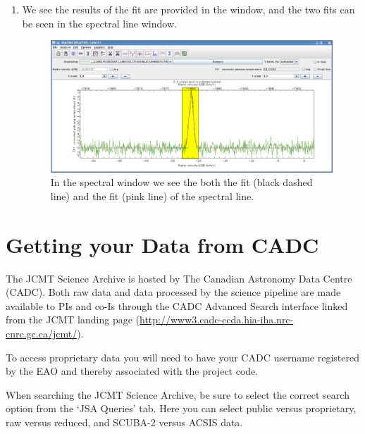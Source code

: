 \documentclass[11pt,oneside,chapters]{starlink}
\begin{document}
\begin{enumerate}[label=(\textbf{\arabic*})]
\item We see the results of the fit are provided in the
 window, and the two fits can
be seen in the spectral line window.

\begin{figure}[h!]
\begin{center}
\includegraphics[width=0.9\linewidth]{sc20_splat_fit5}
\caption[Spectrum with fits.]{\label{fig:splat_stats5}
  In the spectral window we see the both the 
  fit (black dashed line) and the  fit
  (pink line) of the spectral line.}
\end{center}
\end{figure}





\end{enumerate}



\clearpage
\chapter{Getting your Data from CADC}
\label{sec:fromcadc}

The JCMT Science Archive is hosted by The Canadian Astronomy Data
Centre (CADC). Both raw data and data processed by the science pipeline
are made available to PIs and co-Is through the CADC Advanced Search
interface linked from the JCMT landing page
(\url{http://www3.cadc-ccda.hia-iha.nrc-cnrc.gc.ca/jcmt/}).

To access proprietary data you will need to have your CADC username
registered by the EAO and thereby associated with the project code.

When searching the JCMT Science Archive, be sure to select the correct
search option from the `JSA Queries' tab. Here you can select public
versus proprietary, raw versus reduced, and SCUBA-2 versus ACSIS data.
\end{document}
